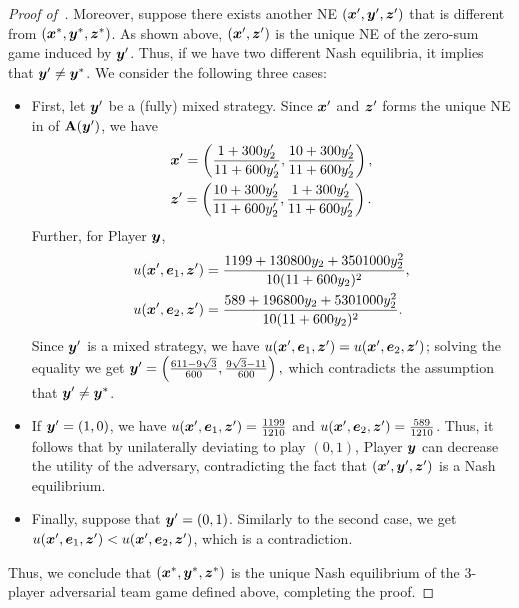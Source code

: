 \begin{proof}[Proof of~]
    Moreover, suppose there exists another NE $({\bm{x}}', {\bm{y}}' ,{\bm{z}}')$ that is different from $({\bm{x}}^*, {\bm{y}}^*, {\bm{z}}^*)$. As shown above, $({\bm{x}}', {\bm{z}}')$ is the unique NE of the zero-sum game induced by ${\bm{y}}'$. Thus, if we have two different Nash equilibria, it implies that ${\bm{y}}' \neq {\bm{y}}^*$. We consider the following three cases:
    \begin{itemize}
        \item First, let ${\bm{y}}'$ be a (fully) mixed strategy. Since ${\bm{x}}'$ and ${\bm{z}}'$ forms the unique NE in of $\mathbf{A}({\bm{y}}')$, we have
        \begin{align*}
            &{\bm{x}}' = \left(\frac{1 + 300  y'_2}{11 + 600  y'_2}, \frac{10 + 300 y'_2}{11 + 600  y'_2}\right),\\
            &{\bm{z}}' = \left(\frac{10 + 300  y'_2}{11 + 600  y'_2}, \frac{1+ 300 y'_2}{11 + 600  y'_2}\right).
        \end{align*}
        Further, for Player ${\bm{y}}$,
        \begin{align*}
            &u({\bm{x}}', {\bm{e}}_1, {\bm{z}}') = \frac{1199 + 130800 y_2 + 3501000 y_2^2}{10(11 + 600 y_2)^2}, \\
            &u({\bm{x}}', {\bm{e}}_2, {\bm{z}}') = \frac{589 + 196800 y_2 + 5301000 y_2^2}{10(11 + 600 y_2)^2}.
        \end{align*}
        Since ${\bm{y}}'$ is a mixed strategy, we have $u({\bm{x}}', {\bm{e}}_1, {\bm{z}}') = u({\bm{x}}', {\bm{e}}_2, {\bm{z}}')$; solving the equality we get $
        {\bm{y}}' = 
        \left(\frac{611 - 9 \sqrt{3}}{600},
            \frac{9\sqrt{3} - 11}{600}\right),
    $ which contradicts the assumption that ${\bm{y}}' \neq {\bm{y}}^*$.
    \item If ${\bm{y}}' = (1, 0)$, we have $u({\bm{x}}', {\bm{e}}_1, {\bm{z}}') = \frac{1199}{1210}$ and $u({\bm{x}}', {\bm{e}}_2, {\bm{z}}') = \frac{589}{1210}$. Thus, it follows that by unilaterally deviating to play $(0, 1)$, Player ${\bm{y}}$ can decrease the utility of the adversary, contradicting the fact that $({\bm{x}}', {\bm{y}}', {\bm{z}}')$ is a Nash equilibrium.
    \item Finally, suppose that ${\bm{y}}' = (0, 1)$. Similarly to the second case, we get $u({\bm{x}}', {\bm{e}}_1, {\bm{z}}') < u({\bm{x}}', {\bm{e}}_2, {\bm{z}}')$, which is a contradiction.
    \end{itemize}
    Thus, we conclude that $({\bm{x}}^*, {\bm{y}}^*, {\bm{z}}^*)$ is the unique Nash equilibrium of the 3-player adversarial team game defined above, completing the proof.
    
\end{proof}

